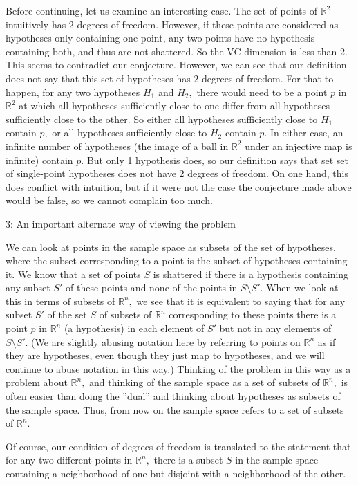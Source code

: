 \documentclass{article}
\begin{document}
Before continuing, let us examine an interesting case. The set of points of $\mathbb{R}^2$ intuitively has 2 degrees of freedom. However, if these points are considered as hypotheses only containing one point, any two points have no hypothesis containing both, and thus are not shattered. So the VC dimension is less than 2. This seems to contradict our conjecture. However, we can see that our definition does not say that this set of hypotheses has 2 degrees of freedom. For that to happen, for any two hypotheses $H_1$ and $H_2,$ there would need to be a point $p$ in $\mathbb{R}^2$ at which all hypotheses sufficiently close to one differ from all hypotheses sufficiently close to the other. So either all hypotheses sufficiently close to $H_1$ contain $p,$ or all hypotheses sufficiently close to $H_2$ contain $p.$ In either case, an infinite number of hypotheses (the image of a ball in $\mathbb{R}^2$ under an injective map is infinite) contain $p.$ But only 1 hypothesis does, so our definition says that set set of single-point hypotheses does not have 2 degrees of freedom. On one hand, this does conflict with intuition, but if it were not the case the conjecture made above would be false, so we cannot complain too much.

3: An important alternate way of viewing the problem

We can look at points in the sample space as subsets of the set of hypotheses, where the subset corresponding to a point is the subset of hypotheses containing it. We know that a set of points $S$ is shattered if there is a hypothesis containing any subset $S'$ of these points and none of the points in $S \setminus S'.$ When we look at this in terms of subsets of $\mathbb{R}^n,$ we see that it is equivalent to saying that for any subset $S'$ of the set $S$ of subsets of $\mathbb{R}^n$ corresponding to these points there is a point $p$ in $\mathbb{R}^n$ (a hypothesis) in each element of $S'$ but not in any elements of $S \setminus S'.$ (We are slightly abusing notation here by referring to points on $\mathbb{R}^n$ as if they are hypotheses, even though they just map to hypotheses, and we will continue to abuse notation in this way.) Thinking of the problem in this way as a problem about $\mathbb{R}^n,$ and thinking of the sample space as a set of subsets of $\mathbb{R}^n,$ is often easier than doing the ''dual'' and thinking about hypotheses as subsets of the sample space. Thus, from now on the sample space refers to a set of subsets of $\mathbb{R}^n.$

Of course, our condition of degrees of freedom is translated to the statement that for any two different points in $\mathbb{R}^n,$ there is a subset $S$ in the sample space containing a neighborhood of one but disjoint with a neighborhood of the other.
\end{document}
